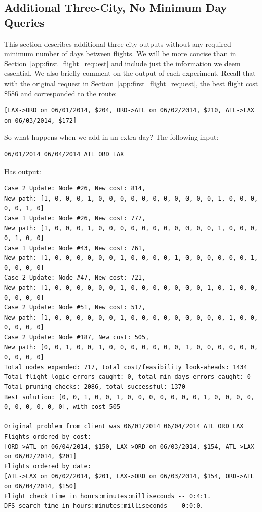 \documentclass{article}
\begin{document}
\subsection{Additional Three-City, No Minimum Day Queries}\label{app:three_city}

This section describes additional three-city outputs without any required minimum number of days between flights. We will be more concise than in
Section~\ref{app:first_flight_request} and include just the information we deem essential. We also briefly comment on the output of each experiment.
Recall that with the original request in Section~\ref{app:first_flight_request}, the best flight cost \$586 and corresponded to the route:

\footnotesize
\begin{verbatim}
[LAX->ORD on 06/01/2014, $204, ORD->ATL on 06/02/2014, $210, ATL->LAX on 06/03/2014, $172] 
\end{verbatim}
\normalsize

So what happens when we add in an extra day? The following input:

\begin{verbatim}
06/01/2014 06/04/2014 ATL ORD LAX
\end{verbatim}

Has output:

\scriptsize
\begin{verbatim}
Case 2 Update: Node #26, New cost: 814, 
New path: [1, 0, 0, 0, 1, 0, 0, 0, 0, 0, 0, 0, 0, 0, 0, 0, 1, 0, 0, 0, 0, 0, 1, 0]
Case 1 Update: Node #26, New cost: 777, 
New path: [1, 0, 0, 0, 1, 0, 0, 0, 0, 0, 0, 0, 0, 0, 0, 0, 1, 0, 0, 0, 0, 1, 0, 0]
Case 1 Update: Node #43, New cost: 761, 
New path: [1, 0, 0, 0, 0, 0, 0, 1, 0, 0, 0, 0, 1, 0, 0, 0, 0, 0, 0, 1, 0, 0, 0, 0]
Case 2 Update: Node #47, New cost: 721, 
New path: [1, 0, 0, 0, 0, 0, 0, 1, 0, 0, 0, 0, 0, 0, 0, 1, 0, 1, 0, 0, 0, 0, 0, 0]
Case 2 Update: Node #51, New cost: 517, 
New path: [1, 0, 0, 0, 0, 0, 0, 1, 0, 0, 0, 0, 0, 0, 0, 0, 0, 1, 0, 0, 0, 0, 0, 0]
Case 2 Update: Node #187, New cost: 505, 
New path: [0, 0, 1, 0, 0, 1, 0, 0, 0, 0, 0, 0, 0, 1, 0, 0, 0, 0, 0, 0, 0, 0, 0, 0]
Total nodes expanded: 717, total cost/feasibility look-aheads: 1434
Total flight logic errors caught: 0, total min-days errors caught: 0
Total pruning checks: 2086, total successful: 1370
Best solution: [0, 0, 1, 0, 0, 1, 0, 0, 0, 0, 0, 0, 0, 1, 0, 0, 0, 0, 0, 0, 0, 0, 0, 0], with cost 505

Original problem from client was 06/01/2014 06/04/2014 ATL ORD LAX
Flights ordered by cost:
[ORD->ATL on 06/04/2014, $150, LAX->ORD on 06/03/2014, $154, ATL->LAX on 06/02/2014, $201]
Flights ordered by date:
[ATL->LAX on 06/02/2014, $201, LAX->ORD on 06/03/2014, $154, ORD->ATL on 06/04/2014, $150]
Flight check time in hours:minutes:milliseconds -- 0:4:1.
DFS search time in hours:minutes:milliseconds -- 0:0:0.
\end{verbatim}
\normalsize
\end{document}
